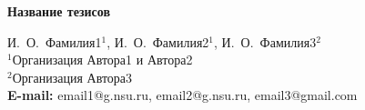\documentclass[a4paper,12pt]{article}
\def\titleK#1{\begin{center}{\Large\textbf{#1}}\end{center}}
\def\authorK#1{\begin{center}{#1}\end{center}}
\newtheorem{theorem}{Теорема}
\newtheorem{lemma}{Лемма}
\newtheorem{corollary}{Следствие}
\newtheorem{proposition}{Предложение}
\theoremstyle{definition}
\newtheorem{definition}{Определение}
\newtheorem{question}{Вопрос}
\newtheorem{conjecture}{Гипотеза}
\begin{document}
\titleK{Название тезисов}
\authorK{И.~О.~Фамилия1$^{1}$, И.~О.~Фамилия2$^{1}$, И.~О.~Фамилия3$^{2}$\\
$^{1}$Организация Автора1 и Автора2 \\ $^{2}$Организация Автора3 \\ {\bf E-mail:} email1@g.nsu.ru, email2@g.nsu.ru, email3@gmail.com}
\begin{abstract}
      Аннотация. Краткое описание содержания работы. \\
\\{\bf Ключевые слова:} \textit{ ключевое слово 1, ключевое слово 2, ключевое слово 3.} 
 \end{abstract}
\end{document}
